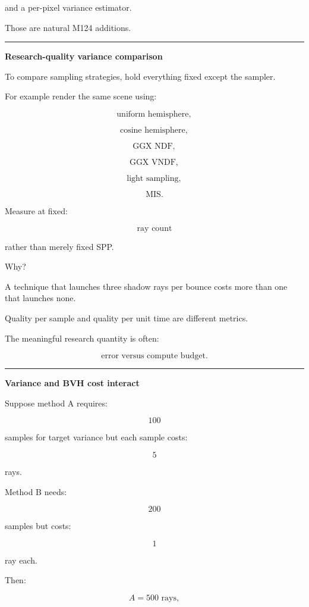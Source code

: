 and a per-pixel variance estimator.

Those are natural M124 additions.

\begin{center}\rule{0.5\linewidth}{0.5pt}\end{center}

\textbf{Research-quality variance comparison}

To compare sampling strategies, hold everything fixed except the sampler.

For example render the same scene using:

\[
\text{uniform hemisphere},
\]

\[
\text{cosine hemisphere},
\]

\[
\text{GGX NDF},
\]

\[
\text{GGX VNDF},
\]

\[
\text{light sampling},
\]

\[
\text{MIS}.
\]

Measure at fixed:

\[
\text{ray count}
\]

rather than merely fixed SPP.

Why?

A technique that launches three shadow rays per bounce costs more than one that launches none.

Quality per sample and quality per unit time are different metrics.

The meaningful research quantity is often:

\[
\boxed{
\text{error versus compute budget}.
}
\]

\begin{center}\rule{0.5\linewidth}{0.5pt}\end{center}

\textbf{Variance and BVH cost interact}

Suppose method A requires:

\[
100
\]

samples for target variance but each sample costs:

\[
5
\]

rays.

Method B needs:

\[
200
\]

samples but costs:

\[
1
\]

ray each.

Then:

\[
A=500\text{ rays},
\]

